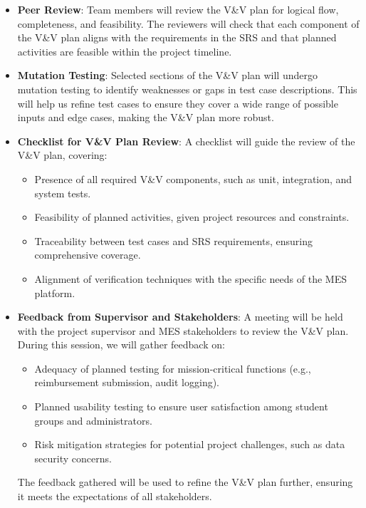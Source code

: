 \documentclass[12pt, titlepage]{article}
\begin{document}
\begin{itemize}
    \item \textbf{Peer Review}: Team members will review the V\&V plan for logical flow, completeness, and feasibility. The reviewers will check that each component of the V\&V plan aligns with the requirements in the SRS and that planned activities are feasible within the project timeline.

    \item \textbf{Mutation Testing}: Selected sections of the V\&V plan will undergo mutation testing to identify weaknesses or gaps in test case descriptions. This will help us refine test cases to ensure they cover a wide range of possible inputs and edge cases, making the V\&V plan more robust.

    \item \textbf{Checklist for V\&V Plan Review}: A checklist will guide the review of the V\&V plan, covering:
    \begin{itemize}
        \item Presence of all required V\&V components, such as unit, integration, and system tests.
        \item Feasibility of planned activities, given project resources and constraints.
        \item Traceability between test cases and SRS requirements, ensuring comprehensive coverage.
        \item Alignment of verification techniques with the specific needs of the MES platform.
    \end{itemize}

    \item \textbf{Feedback from Supervisor and Stakeholders}: A meeting will be held with the project supervisor and MES stakeholders to review the V\&V plan. During this session, we will gather feedback on:
    \begin{itemize}
        \item Adequacy of planned testing for mission-critical functions (e.g., reimbursement submission, audit logging).
        \item Planned usability testing to ensure user satisfaction among student groups and administrators.
        \item Risk mitigation strategies for potential project challenges, such as data security concerns.
    \end{itemize}
    The feedback gathered will be used to refine the V\&V plan further, ensuring it meets the expectations of all stakeholders.
\end{itemize}
\end{document}
